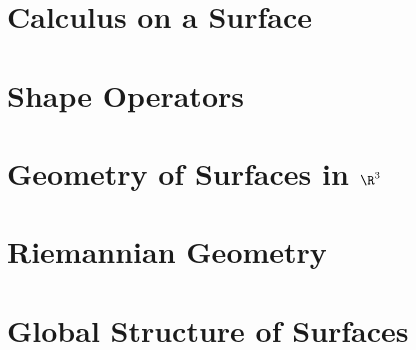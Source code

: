\newpage
\section{Calculus on a Surface}
\section{Shape Operators}
\section{Geometry of Surfaces in ${\R}^{3}$}
\section{Riemannian Geometry}
\section{Global Structure of Surfaces}